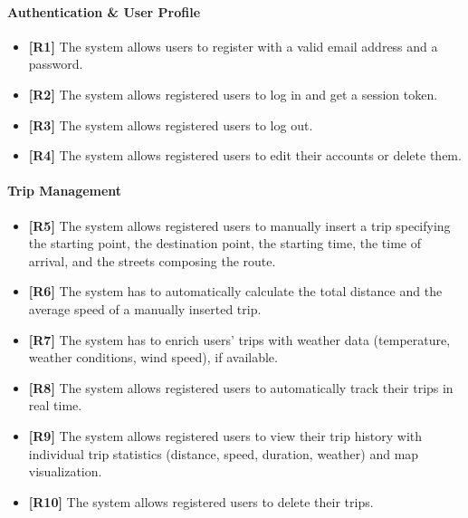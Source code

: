 \paragraph{Authentication \& User Profile}
\begin{itemize}
    \item[] \textbf{[R1]} The system allows users to register with a valid email address and a password.
    \item[] \textbf{[R2]} The system allows registered users to log in and get a session token.
    \item[] \textbf{[R3]} The system allows registered users to log out.
    \item[] \textbf{[R4]} The system allows registered users to edit their accounts or delete them.
\end{itemize}

\paragraph{Trip Management}
\begin{itemize}
    \item[] \textbf{[R5]} The system allows registered users to manually insert a trip specifying the starting point, the destination point, the starting time, the time of arrival, and the streets composing the route.
    \item[] \textbf{[R6]} The system has to automatically calculate the total distance and the average speed of a manually inserted trip.
    \item[] \textbf{[R7]} The system has to enrich users' trips with weather data (temperature, weather conditions, wind speed), if available.
    \item[] \textbf{[R8]} The system allows registered users to automatically track their trips in real time.
\item[] \textbf{[R9]} The system allows registered users to view their trip history with individual trip statistics (distance, speed, duration, weather) and map visualization.
\item[] \textbf{[R10]} The system allows registered users to delete their trips.
\end{itemize}


